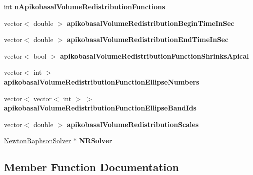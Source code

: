 \begin{DoxyCompactItemize}
\item 
\hypertarget{classSimulation_a59a682ea8f4bc5986abe72760b448e65}{}int {\bfseries n\+Apikobasal\+Volume\+Redistribution\+Functions}\label{classSimulation_a59a682ea8f4bc5986abe72760b448e65}

\item 
\hypertarget{classSimulation_a7756714b54a2917b7ae7ab8aa027ddd2}{}vector$<$ double $>$ {\bfseries apikobasal\+Volume\+Redistribution\+Begin\+Time\+In\+Sec}\label{classSimulation_a7756714b54a2917b7ae7ab8aa027ddd2}

\item 
\hypertarget{classSimulation_aed2334c12970d1fb6c6f304b4ee71ce6}{}vector$<$ double $>$ {\bfseries apikobasal\+Volume\+Redistribution\+End\+Time\+In\+Sec}\label{classSimulation_aed2334c12970d1fb6c6f304b4ee71ce6}

\item 
\hypertarget{classSimulation_a311218e75b3cca41c1165ab4a555ad55}{}vector$<$ bool $>$ {\bfseries apikobasal\+Volume\+Redistribution\+Function\+Shrinks\+Apical}\label{classSimulation_a311218e75b3cca41c1165ab4a555ad55}

\item 
\hypertarget{classSimulation_a20768f5b492cb75be15afa1ace01f8b6}{}vector$<$ int $>$ {\bfseries apikobasal\+Volume\+Redistribution\+Function\+Ellipse\+Numbers}\label{classSimulation_a20768f5b492cb75be15afa1ace01f8b6}

\item 
\hypertarget{classSimulation_a7a30bd1f7da08d3d7a38158e7d56aca5}{}vector$<$ vector$<$ int $>$ $>$ {\bfseries apikobasal\+Volume\+Redistribution\+Function\+Ellipse\+Band\+Ids}\label{classSimulation_a7a30bd1f7da08d3d7a38158e7d56aca5}

\item 
\hypertarget{classSimulation_a5803747fdae6781c7a7b39c586dadd9d}{}vector$<$ double $>$ {\bfseries apikobasal\+Volume\+Redistribution\+Scales}\label{classSimulation_a5803747fdae6781c7a7b39c586dadd9d}

\item 
\hypertarget{classSimulation_a3d66302c4db767b917c866460d34a4c6}{}\hyperlink{classNewtonRaphsonSolver}{Newton\+Raphson\+Solver} $\ast$ {\bfseries N\+R\+Solver}\label{classSimulation_a3d66302c4db767b917c866460d34a4c6}

\end{DoxyCompactItemize}


\subsection{Member Function Documentation}
\hypertarget{classSimulation_a51cb5448f660eeefc54a5d2a33ab561e}{}
